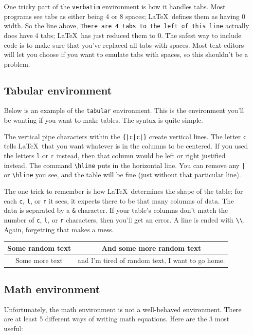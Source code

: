 \documentclass[letterpaper]{article}
\begin{document}
One tricky part of the \verb+verbatim+ environment is how it handles 
tabs.  Most programs see tabs as either being 4 or 8 spaces; \LaTeX\ 
defines them as having 0 width.  So the line above, \texttt{There are 4 
tabs to the left of this line} actually does have 4 tabs; \LaTeX\ has 
just reduced them to 0. The safest way to include code is to make sure 
that you've replaced all tabs with spaces.  Most text editors will let 
you choose if you want to emulate tabs with spaces, so this shouldn't be 
a problem.

\subsection{Tabular environment}

Below is an example of the \verb+tabular+ environment.  This is the 
environment you'll be wanting if you want to make tables.  The syntax is 
quite simple.

The vertical pipe characters within the \verb+{|c|c|}+ create vertical 
lines.  The letter \verb+c+ tells \LaTeX\ that you want whatever is in 
the columns to be centered.  If you used the letters \verb+l+ or 
\verb+r+ instead, then that column would be left or right justified 
instead.  The command \verb+\hline+ puts in the horizontal line.  You 
can remove any \verb+|+ or \verb+\hline+ you see, and the table will be 
fine (just without that particular line).

The one trick to remember is how \LaTeX\ determines the shape of the 
table; for each \verb+c+, \verb+l+, or \verb+r+ it sees, it expects 
there to be that many columns of data.  The data is separated by a 
\verb+&+ character.  If your table's columns don't match the number of 
\verb+c+, \verb+l+, or \verb+r+ characters, then you'll get an error.  A 
line is ended with \verb+\\+.  Again, forgetting that makes a mess.

\bigskip

\begin{tabular}{|c|c|} \hline \hline
Some random text & And some more random text \\ \hline
Some more text & and I'm tired of random text, I want to go home. \\ \hline
\end{tabular}

\subsection{Math environment}
\label{Math environment}
Unfortunately, the math environment is not a well-behaved environment.  
There are at least 5 different ways of writing math equations.  Here are 
the 3 most useful:
\end{document}
